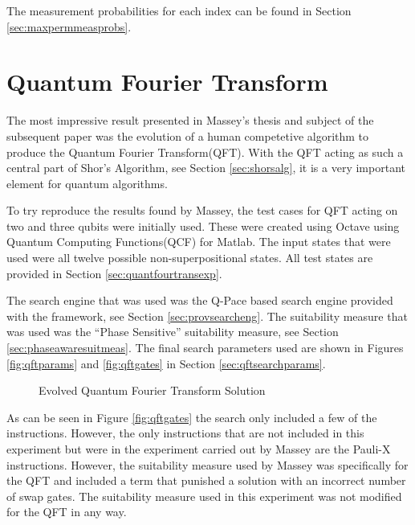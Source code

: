 The measurement probabilities for each index can be found in Section \ref{sec:maxpermmeasprobs}.



\section{Quantum Fourier Transform}
\label{sec:evoqft}

The most impressive result presented in Massey's thesis\cite{masseythesis} and subject of the subsequent paper\cite{Massey:2005:EHQ:1068009.1068288} was the evolution of a human competetive algorithm to produce the Quantum Fourier Transform(QFT).
With the QFT acting as such a central part of Shor's Algorithm, see Section \ref{sec:shorsalg}, it is a very important element for quantum algorithms.

To try reproduce the results found by Massey, the test cases for QFT acting on two and three qubits were initially used.
These were created using Octave\cite{octweb} using Quantum Computing Functions(QCF) for Matlab\cite{qcfweb}.
The input states that were used were all twelve possible non-superpositional states.
All test states are provided in Section \ref{sec:quantfourtransexp}.

The search engine that was used was the Q-Pace based search engine provided with the framework, see Section \ref{sec:provsearcheng}.
The suitability measure that was used was the ``Phase Sensitive'' suitability measure, see Section \ref{sec:phaseawaresuitmeas}.
The final search parameters used are shown in Figures \ref{fig:qftparams} and \ref{fig:qftgates} in Section \ref{sec:qftsearchparams}.

\begin{figure}
\centering
{}
\caption{Evolved Quantum Fourier Transform Solution}
\label{fig:evoqftsol}
\end{figure}

As can be seen in Figure \ref{fig:qftgates} the search only included a few of the instructions.
However, the only instructions that are not included in this experiment but were in the experiment carried out by Massey are the Pauli-X instructions.
However, the suitability measure used by Massey was specifically for the QFT and included a term that punished a solution with an incorrect number of swap gates.
The suitability measure used in this experiment was not modified for the QFT in any way.

